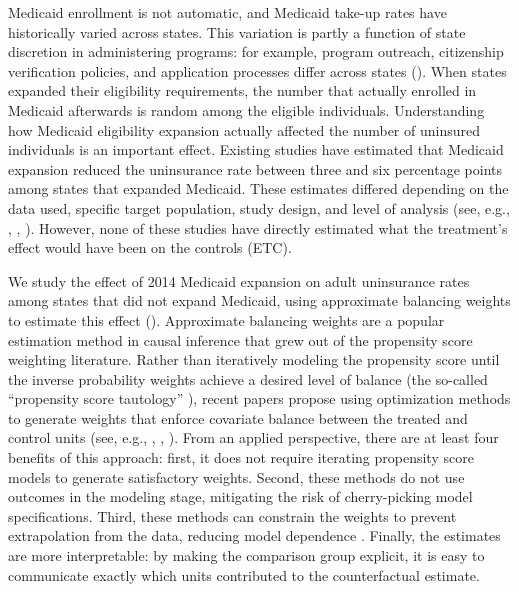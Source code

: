\documentclass[aoas]{imsart}
\theoremstyle{plain}
\theoremstyle{remark}
\begin{document}
Medicaid enrollment is not automatic, and Medicaid take-up rates have historically varied across states. This variation is partly a function of state discretion in administering programs: for example, program outreach, citizenship verification policies, and application processes differ across states (\cite{courtemanche2017early}). When states expanded their eligibility requirements, the number that actually enrolled in Medicaid afterwards is random among the eligible individuals. Understanding how Medicaid eligibility expansion actually affected the number of uninsured individuals is an important effect. Existing studies have estimated that Medicaid expansion reduced the uninsurance rate between three and six percentage points among states that expanded Medicaid. These estimates differed depending on the data used, specific target population, study design, and level of analysis (see, e.g., \cite{kaestner2017effects}, \cite{courtemanche2017early}, \cite{frean2017premium}). However, none of these studies have directly estimated what the treatment's effect would have been on the controls (ETC). 

We study the effect of 2014 Medicaid expansion on adult uninsurance rates among states that did not expand Medicaid, using approximate balancing weights to estimate this effect (\cite{wang2017minimal}). Approximate balancing weights are a popular estimation method in causal inference that grew out of the propensity score weighting literature. Rather than iteratively modeling the propensity score until the inverse probability weights achieve a desired level of balance (the so-called ``propensity score tautology'' \cite{imai2014covariate}), recent papers propose using optimization methods to generate weights that enforce covariate balance between the treated and control units (see, e.g., \cite{hainmueller2012entropy}, \cite{imai2014covariate}, \cite{zubizarreta2015stable}). From an applied perspective, there are at least four benefits of this approach: first, it does not require iterating propensity score models to generate satisfactory weights. Second, these methods do not use outcomes in the modeling stage, mitigating the risk of cherry-picking model specifications. Third, these methods can constrain the weights to prevent extrapolation from the data, reducing model dependence \cite{zubizarreta2015stable}. Finally, the estimates are more interpretable: by making the comparison group explicit, it is easy to communicate exactly which units contributed to the counterfactual estimate.
\end{document}

